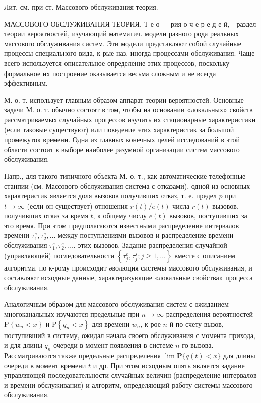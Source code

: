 \documentclass[10pt]{article}
\begin{document}
Лит. см. при ст. Массового обслуживания теория.



МАССОВОГО ОБСЛУЖИВАНИЯ ТЕОРИЯ, Т е о- $^{-}$ рия о ч е р е д е й, - раздел теории вероятностей, изучающий математич. модели разного рода реальных массового обслуживания систем. Эти модели представляют собой случайные процессы специального вида, к-рые наз. иногда процессами обслуживания. Чаще всего используется описательное определение этих процессов, поскольку формальное их построение оказывается весьма сложным и не всегда эффективным.



М. о. т. использует главным образом аппарат теории вероятностей. Основные задачи М. о. т. обычно состоят в том, чтобы на основании «локальных» свойств рассматриваемых случайных процессов изучить их стационарные характеристики (если таковые существуют) или поведение этих характеристик за большой промежуток времени. Одна из главных конечных целей исследований в этой области состоит в выборе наиболее разумной организации систем массового обслуживания.



Напр., для такого типичного объекта М. о. т., как автоматические телефонные станпии (см. Массового обслуживания система с отказами), одной из основных характеристик является доля вызовов получивших отказ, т. е. предел $p$ при $t \rightarrow \infty$ (если он существует) отношения $r(t) / e(t)$ числа $r(t)$ вызовов, получивших отказ за время $t$, к общему числу $e(t)$ вызовов, поступивших за это время. При этом предполагаются известными распределение интервалов времени $\tau_{1}^{e}, \tau_{2}^{e}, \ldots$ между поступлениями вызовов и распределение времени обслуживания $\tau_{1}^{s}, \tau_{2}^{s}, \ldots$. этих вызовов. Задание распределения случайной (управляющей) последовательности $\left\{\tau_{j}^{e}, \tau_{j}^{s} ; j \geqslant 1, \ldots\right\}$ вместе с описанием алгоритма, по к-рому происходит әволюция системы массового обслуживания, и составляют исходные данные, характеризующие «локальные свойства» процесса обслуживания.



Аналогичным образом для массового обслуживания систем с ожиданием многоканальных изучаются предельные при $n \rightarrow \infty$ распределения вероятностей $\mathrm{P}\left\{w_{n}<x\right\}$ и $\mathrm{P}\left\{q_{n}<x\right\}$ для времени $w_{n}$, к-рое $n$-й по счету вызов, поступивший в систему, ожидал начала своего обслуживания с момента прихода, и для длины $q_{n}$ очереди в момент появления в системе $n$-го вызова. Рассматриваются также предельные распределения $\lim \mathbf{P}\{q(t)<x\}$ для длины очереди в момент времени $t$ и др. При этом исходным опять является задание управляющей последовательности случайных величин (распределение интервалов и времени обслуживания) и алгоритм, определяющий работу системы массового обслуживания.
\end{document}
